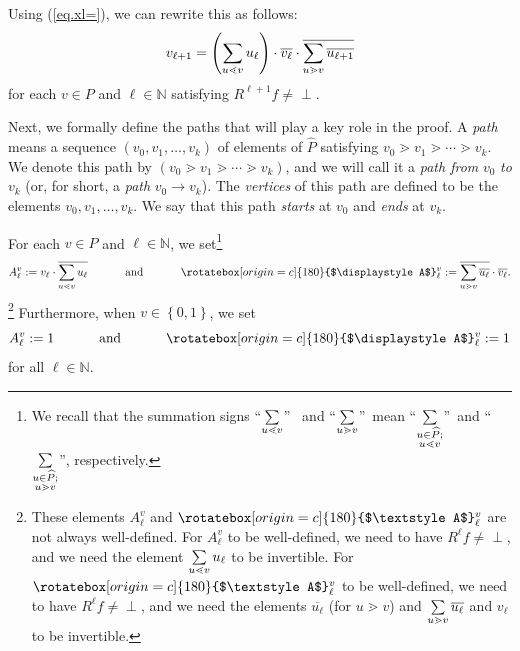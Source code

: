 \documentclass[numbers=enddot,12pt,final,onecolumn,notitlepage]{scrartcl}%
\theoremstyle{definition}
\newcommand{\undf}{\operatorname*{\bot}}
\newcommand{\upslack}{\mathchoice{\rotatebox[origin=c]{180}{$\displaystyle A$}}{\rotatebox[origin=c]{180}{$\textstyle A$}}{\rotatebox[origin=c]{180}{$\scriptstyle A$}}{\rotatebox[origin=c]{180}{$\scriptscriptstyle A$}}}
\newcommand{\downslack}{A}
\let\sumnonlimits\sum
\renewcommand{\sum}{\sumnonlimits\limits}
\begin{document}
Using (\ref{eq.xl=}), we can rewrite this as follows:%
\begin{equation}
v_{\ell+1}=\left(  \sum\limits_{u\lessdot v}u_{\ell}\right)  \cdot
\overline{v_{\ell}}\cdot\overline{\sum\limits_{u\gtrdot v}\overline{u_{\ell
+1}}} \label{eq.vl+1=}%
\end{equation}
for each $v\in P$ and $\ell\in\mathbb{N}$ satisfying $R^{\ell+1}f\neq\undf$.

Next, we formally define the paths that will play a key role in the proof. A
\emph{path} means a sequence $\left(  v_{0},v_{1},\ldots,v_{k}\right)  $ of
elements of $\widehat{P}$ satisfying $v_{0}\gtrdot v_{1}\gtrdot\cdots\gtrdot
v_{k}$. We denote this path by $\left(  v_{0}\gtrdot v_{1}\gtrdot\cdots\gtrdot
v_{k}\right)  $, and we will call it a \emph{path from }$v_{0}$\emph{ to
}$v_{k}$ (or, for short, a \emph{path }$v_{0}\rightarrow v_{k}$). The
\emph{vertices} of this path are defined to be the elements $v_{0}%
,v_{1},\ldots,v_{k}$. We say that this path \emph{starts} at $v_{0}$ and
\emph{ends} at $v_{k}$.

For each $v\in P$ and $\ell\in\mathbb{N}$, we set\footnote{We recall that the
summation signs \textquotedblleft$\sum\limits_{u\lessdot v}$\textquotedblright%
\ and \textquotedblleft$\sum\limits_{u\gtrdot v}$\textquotedblright\ mean
\textquotedblleft$\sum\limits_{\substack{u\in\widehat{P};\\u\lessdot v}%
}$\textquotedblright\ and \textquotedblleft$\sum\limits_{\substack{u\in
\widehat{P};\\u\gtrdot v}}$\textquotedblright, respectively.}%
\[
\downslack_{\ell}^{v}:=v_{\ell}\cdot\overline{\sum\limits_{u\lessdot v}%
u_{\ell}}\ \ \ \ \ \ \ \ \ \ \text{and}\ \ \ \ \ \ \ \ \ \ \upslack_{\ell}%
^{v}:=\overline{\sum\limits_{u\gtrdot v}\overline{u_{\ell}}}\cdot
\overline{v_{\ell}}.
\]
\footnote{These elements $\downslack_{\ell}^{v}$ and $\upslack_{\ell}^{v}$ are
not always well-defined. For $\downslack_{\ell}^{v}$ to be well-defined, we
need to have $R^{\ell}f\neq\undf$, and we need the element $\sum
\limits_{u\lessdot v}u_{\ell}$ to be invertible. For $\upslack_{\ell}^{v}$ to
be well-defined, we need to have $R^{\ell}f\neq\undf$, and we need the
elements $\overline{u_{\ell}}$ (for $u\gtrdot v$) and $\sum\limits_{u\gtrdot
v}\overline{u_{\ell}}$ and $v_{\ell}$ to be invertible.} Furthermore, when
$v\in\left\{  0,1\right\}  $, we set
\begin{equation}
\downslack_{\ell}^{v}:=1\ \ \ \ \ \ \ \ \ \ \text{and}%
\ \ \ \ \ \ \ \ \ \ \upslack_{\ell}^{v}:=1 \label{eq.slack.1}%
\end{equation}
for all $\ell\in\mathbb{N}$.
\end{document}
